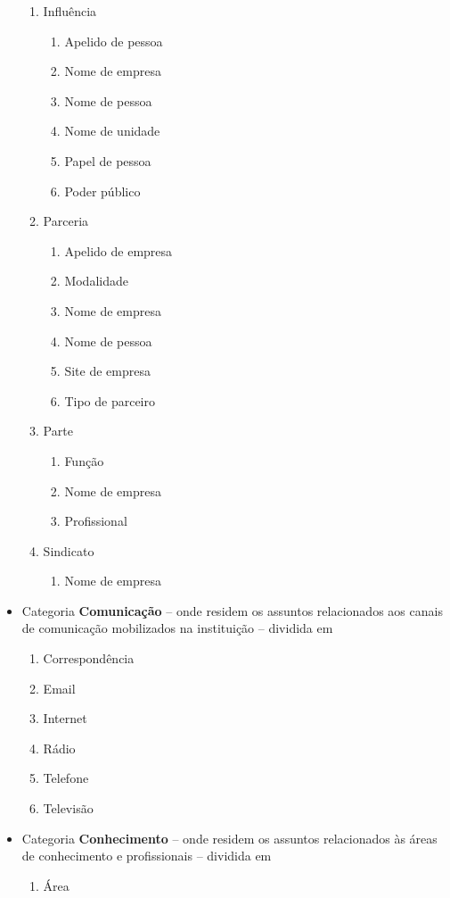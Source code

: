 \begin{multicols}{2}
\begin{itemize}
\begin{enumerate}
			\item Influência	\begin{enumerate} 	\item Apelido de pessoa		
					\item Nome de empresa		
					\item Nome de pessoa		
					\item Nome de unidade		
					\item Papel de pessoa		
					\item Poder público	\end{enumerate}	
			\item Parceria	\begin{enumerate}			
					\item Apelido de empresa		
					\item Modalidade		
					\item Nome de empresa		
					\item Nome de pessoa		
					\item Site de empresa		
					\item Tipo de parceiro	\end{enumerate}	
			\item Parte	\begin{enumerate}			
					\item Função		
					\item Nome de empresa		
			\item Profissional			\end{enumerate}	
			\item Sindicato	\begin{enumerate}			
					\item Nome de empresa	\end{enumerate}	
\end{enumerate}	\item Categoria \textbf{Comunicação} -- onde residem os assuntos relacionados aos canais de comunicação mobilizados na instituição -- dividida em	\begin{enumerate} 	\item Correspondência				
			\item Email				
			\item Internet				
			\item Rádio				
			\item Telefone				
			\item Televisão				
\end{enumerate}	\item Categoria \textbf{Conhecimento} -- onde residem os assuntos relacionados às áreas de conhecimento e profissionais -- dividida em	\begin{enumerate} 	\item Área				

\end{enumerate}
\end{itemize}
\end{multicols}
